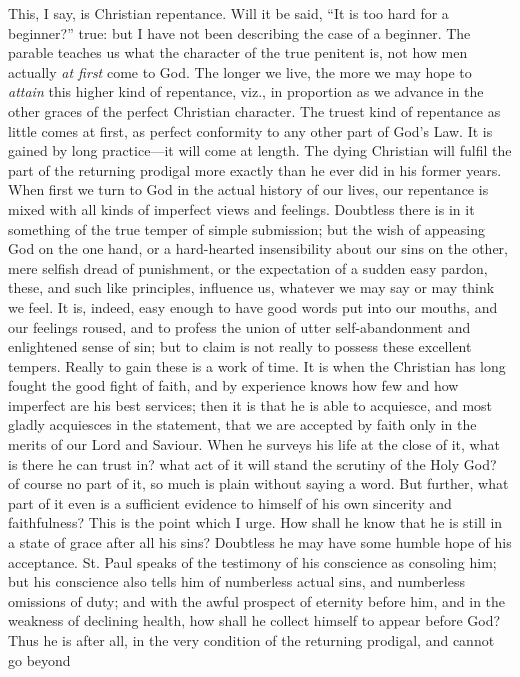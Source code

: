 This, I say, is Christian repentance. Will it be said, ``It is
too hard for a beginner?'' true: but I have not been describing
the case of a beginner. The parable teaches us what the character of
the true penitent is, not how men actually \emph{at first} come to
God. The longer we live, the more we may hope to \emph{attain} this
higher kind of repentance, viz., in proportion as we advance in the
other graces of the perfect Christian character. The truest kind of
repentance as little comes at first, as perfect conformity to any
other part of God's Law. It is gained by long practice—it will come
at length. The dying Christian will fulfil the part of the returning
prodigal more exactly than he ever did in his former years. When first
we turn to God in the actual history of our lives, our repentance is
mixed with all kinds of imperfect views and feelings. Doubtless there
is in it something of the true temper of simple submission; but the
wish of appeasing God on the one hand, or a hard-hearted insensibility
about our sins on the other, mere selfish dread of punishment, or the
expectation of a sudden easy pardon, these, and such like principles,
influence us, whatever we may say or may think we feel. It is, indeed,
easy enough to have good words put into our mouths, and our feelings
roused, and to profess the union of utter self-abandonment and
enlightened sense of sin; but to claim is not really to possess these
excellent tempers. Really to gain these is a work of time. It is when
the Christian has long fought the good fight of faith, and by
experience knows how few and how imperfect are his best services; then
it is that he is able to acquiesce, and most gladly acquiesces in the
statement, that we are accepted by faith only in the merits of our
Lord and Saviour. When he surveys his life at the close of it, what is
there he can trust in? what act of it will stand the scrutiny of the
Holy God? of course no part of it, so much is plain without saying
a
word. But further, what part of it even is a sufficient evidence to
himself of his own sincerity and faithfulness? This is the point which
I urge. How shall he know that he is still in a state of grace after
all his sins? Doubtless he may have some humble hope of his
acceptance. St. Paul speaks of the testimony of his conscience as
consoling him; but his conscience also tells him of numberless actual
sins, and numberless omissions of duty; and with the awful prospect of
eternity before him, and in the weakness of declining health, how
shall he collect himself to appear before God? Thus he is after all,
in the very condition of the returning prodigal, and cannot go beyond
